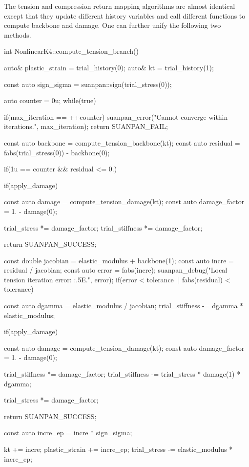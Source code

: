 The tension and compression return mapping algorithms are almost identical except that they update different history variables and call different functions to compute backbone and damage. One can further unify the following two methods.
\begin{cppcode}
int NonlinearK4::compute_tension_branch() {
    auto& plastic_strain = trial_history(0);
    auto& kt = trial_history(1);

    const auto sign_sigma = suanpan::sign(trial_stress(0));

    auto counter = 0u;
    while(true) {
        if(max_iteration == ++counter) {
            suanpan_error("Cannot converge within {} iterations.\n", max_iteration);
            return SUANPAN_FAIL;
        }

        const auto backbone = compute_tension_backbone(kt);
        const auto residual = fabs(trial_stress(0)) - backbone(0);

        if(1u == counter && residual <= 0.) {
            if(apply_damage) {
                const auto damage = compute_tension_damage(kt);
                const auto damage_factor = 1. - damage(0);

                trial_stress *= damage_factor;
                trial_stiffness *= damage_factor;
            }

            return SUANPAN_SUCCESS;
        }

        const double jacobian = elastic_modulus + backbone(1);
        const auto incre = residual / jacobian;
        const auto error = fabs(incre);
        suanpan_debug("Local tension iteration error: {:.5E}.\n", error);
        if(error < tolerance || fabs(residual) < tolerance) {
            const auto dgamma = elastic_modulus / jacobian;
            trial_stiffness -= dgamma * elastic_modulus;

            if(apply_damage) {
                const auto damage = compute_tension_damage(kt);
                const auto damage_factor = 1. - damage(0);

                trial_stiffness *= damage_factor;
                trial_stiffness -= trial_stress * damage(1) * dgamma;

                trial_stress *= damage_factor;
            }

            return SUANPAN_SUCCESS;
        }

        const auto incre_ep = incre * sign_sigma;

        kt += incre;
        plastic_strain += incre_ep;
        trial_stress -= elastic_modulus * incre_ep;
    }
}


\end{cppcode}
